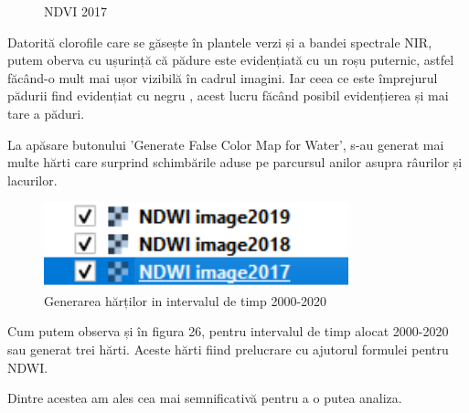 \documentclass[12pt,a4paper]{article}
\theoremstyle{definition}
\theoremstyle{remark}
\begin{document}
\begin{figure}[!htb]
\begin{minipage}{0.48\textwidth}
     \caption{NDVI 2017}
   \end{minipage}
\end{figure}
Datorită clorofile care se găsește în plantele verzi și a bandei spectrale NIR, putem oberva cu ușurință că pădure este evidențiată cu un roșu puternic, astfel făcând-o mult mai ușor vizibilă în cadrul imagini. Iar ceea ce este împrejurul pădurii find evidențiat  cu negru , acest lucru făcând posibil evidențierea și mai tare a păduri.

La apăsare butonului 'Generate False Color Map for Water', s-au generat mai multe  hărti care surprind schimbările aduse pe parcursul anilor asupra râurilor și lacurilor.


\begin{figure}[H]
  \centering
  \includegraphics[width=250pt]{hartinoi.PNG}
  \caption{Generarea hărților in intervalul de timp 2000-2020}   
\end{figure}

Cum putem observa și în figura 26, pentru intervalul de timp alocat 2000-2020 sau generat trei hărti. Aceste hărti fiind prelucrare cu ajutorul formulei pentru NDWI.

Dintre acestea am ales cea mai semnificativă pentru a o putea analiza.
\end{document}
